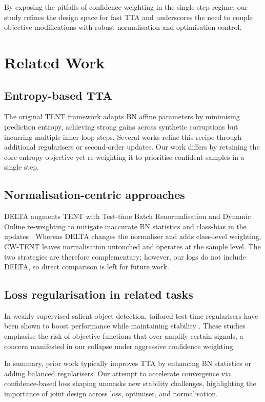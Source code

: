 \documentclass{article} %
\begin{document}
By exposing the pitfalls of confidence weighting in the single-step regime, our study refines the design space for fast TTA and underscores the need to couple objective modifications with robust normalisation and optimisation control.

\section{Related Work}
\label{sec:related}
\subsection{Entropy-based TTA}
The original TENT framework adapts BN affine parameters by minimising prediction entropy, achieving strong gains across synthetic corruptions but incurring multiple inner-loop steps. Several works refine this recipe through additional regularisers or second-order updates. Our work differs by retaining the core entropy objective yet re-weighting it to prioritise confident samples in a single step.

\subsection{Normalisation-centric approaches}
DELTA augments TENT with Test-time Batch Renormalisation and Dynamic Online re-weighting to mitigate inaccurate BN statistics and class-bias in the updates \cite{zhao-2023-delta}. Whereas DELTA changes the normaliser and adds class-level weighting, CW-TENT leaves normalisation untouched and operates at the sample level. The two strategies are therefore complementary; however, our logs do not include DELTA, so direct comparison is left for future work.

\subsection{Loss regularisation in related tasks}
In weakly supervised salient object detection, tailored test-time regularisers have been shown to boost performance while maintaining stability \cite{author-year-test}. These studies emphasise the risk of objective functions that over-amplify certain signals, a concern manifested in our collapse under aggressive confidence weighting.

In summary, prior work typically improves TTA by enhancing BN statistics or adding balanced regularisers. Our attempt to accelerate convergence via confidence-based loss shaping unmasks new stability challenges, highlighting the importance of joint design across loss, optimiser, and normalisation.
\end{document}
